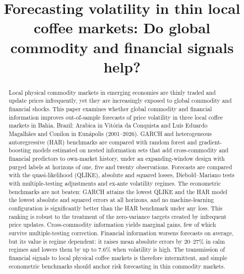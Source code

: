 \documentclass[a4paper,fleqn]{cas-sc}
\begin{document}
\let\WriteBookmarks\relax
\def\floatpagepagefraction{1}
\def\textpagefraction{.001}



\title [mode = title]{Forecasting volatility in thin local coffee markets: Do global commodity and financial signals help?}


\begin{abstract}
Local physical commodity markets in emerging economies are thinly traded and update prices infrequently, yet they are increasingly exposed to global commodity and financial shocks. This paper examines whether global commodity and financial information improves out-of-sample forecasts of price volatility in three local coffee markets in Bahia, Brazil: Arabica in Vitória da Conquista and Luís Eduardo Magalhães and Conilon in Eunápolis (2001--2026). GARCH and heterogeneous autoregressive (HAR) benchmarks are compared with random forest and gradient-boosting models estimated on nested information sets that add cross-commodity and financial predictors to own-market history, under an expanding-window design with purged labels at horizons of one, five and twenty observations. Forecasts are compared with the quasi-likelihood (QLIKE), absolute and squared losses, Diebold--Mariano tests with multiple-testing adjustments and ex-ante volatility regimes. The econometric benchmarks are not beaten: GARCH attains the lowest QLIKE and the HAR model the lowest absolute and squared errors at all horizons, and no machine-learning configuration is significantly better than the HAR benchmark under any loss. This ranking is robust to the treatment of the zero-variance targets created by infrequent price updates. Cross-commodity information yields marginal gains, few of which survive multiple-testing correction. Financial information worsens forecasts on average, but its value is regime dependent: it raises mean absolute errors by 20--27\% in calm regimes and lowers them by up to 7.6\% when volatility is high. The transmission of financial signals to local physical coffee markets is therefore intermittent, and simple econometric benchmarks should anchor risk forecasting in thin commodity markets.
\end{abstract}
\end{document}
